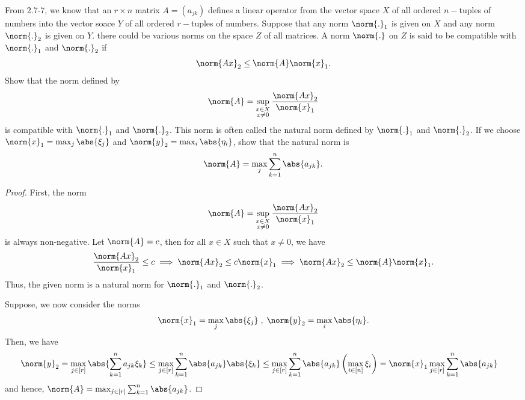\begin{question}
    From 2.7-7, we know that an $r \times n$ matrix $A = (a_{jk})$ defines a linear operator from the vector space $X$ of all ordered $n-$tuples of numbers into the vector soace $Y$ of all ordered $r-$tuples of numbers. Suppose that any norm $\norm{.}_1$ is given on $X$ and any norm $\norm{.}_2$ is given on $Y$. there could be various norms on the space $Z$ of all matrices. A norm $\norm{.}$ on $Z$ is said to be compatible with $\norm{.}_1$ and $\norm{.}_2$ if 
    \[\norm{Ax}_2 \leq \norm{A}\norm{x}_1.\]
    Show that the norm defined by
    \[\norm{A} = \sup_{\substack{x \in X \\ x \neq 0}} \frac{\norm{Ax}_2}{\norm{x}_1}\]
    is compatible with $\norm{.}_1$ and $\norm{.}_2$. This norm is often called the natural norm defined by $\norm{.}_1$ and $\norm{.}_2$. If we choose $\norm{x}_1 = \max_{j} \abs{\xi_j}$ and $\norm{y}_2 = \max_i \abs{\eta_i}$, show that the natural norm is 
    \[\norm{A} = \max_j \sum_{k=1}^n \abs{a_{jk}}.\]
    \label{section2.7-12}
\end{question}
\begin{proof}
    First, the norm
    \[\norm{A} = \sup_{\substack{x \in X \\ x \neq 0}} \frac{\norm{Ax}_2}{\norm{x}_1}\]
    is always non-negative. Let $\norm{A} = c$, then for all $x \in X$ such that $x \neq 0$, we have
    \[\frac{\norm{Ax}_2}{\norm{x}_1} \leq c \implies \norm{Ax}_2 \leq c \norm{x}_1 \implies \norm{Ax}_2 \leq \norm{A} \norm{x}_1.\]
    Thus, the given norm is a natural norm for $\norm{.}_1$ and $\norm{.}_2$.

    Suppose, we now consider the norms
    \[\norm{x}_1 = \max_{j} \abs{\xi_j} \;,\; \norm{y}_2 = \max_{i} \abs{\eta_i}.\]
    Then, we have
    \begin{align*}
        \norm{y}_2 &= \max_{j \in [r]} \abs{\sum_{k=1}^n a_{jk} \xi_k} \leq \max_{j \in [r]} \sum_{k=1}^n \abs{a_{jk}} \abs{\xi_k} \leq \max_{j \in [r]} \sum_{k=1}^n \abs{a_{jk}} \left(\max_{i 
        \in [n]} \xi_i \right) = \norm{x}_1 \max_{j \in [r]} \sum_{k=1}^n \abs{a_{jk}}
    \end{align*}
    and hence, $\norm{A} = \max_{j \in [r]} \sum_{k=1}^n \abs{a_{jk}}$.
\end{proof}

